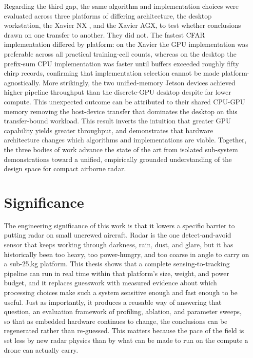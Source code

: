 Regarding the third gap, the same algorithm and implementation choices were evaluated 
across three platforms of differing architecture, the desktop workstation, the Xavier NX
, and the Xavier AGX, to test whether conclusions drawn on one transfer to another. 
They did not. The fastest CFAR implementation differed by platform: on the Xavier the 
GPU implementation was preferable across all practical training-cell counts, whereas on 
the desktop the prefix-sum CPU implementation was faster until buffers exceeded roughly 
fifty chirp records, confirming that implementation selection cannot be made platform-
agnostically. More strikingly, the two unified-memory Jetson devices achieved higher 
pipeline throughput than the discrete-GPU desktop despite far lower compute. This unexpected outcome
can be attributed to their shared CPU-GPU memory removing the host-device transfer that 
dominates the desktop on this transfer-bound workload. This result inverts the 
intuition that greater GPU capability yields greater throughput, and demonstrates that 
hardware architecture changes which algorithms and implementations are viable. 
Together, the three bodies of work advance the state of 
the art from isolated sub-system demonstrations toward a unified, empirically grounded 
understanding of the design space for compact airborne radar.

\section{Significance}

The engineering significance of this work is that it lowers a specific barrier to 
putting radar on small uncrewed aircraft. Radar is the one detect-and-avoid sensor that 
keeps working through darkness, rain, dust, and glare, but it has historically been too 
heavy, too power-hungry, and too coarse in angle to carry on a sub-25,kg platform. This 
thesis shows that a complete sensing-to-tracking pipeline can run in real time within 
that platform's size, weight, and power budget, and it replaces guesswork with measured 
evidence about which processing choices make such a system sensitive enough and fast 
enough to be useful. Just as importantly, it produces a reusable way of answering that 
question, an evaluation framework of profiling, ablation, and parameter sweeps, so that 
as embedded hardware continues to change, the conclusions can be regenerated rather 
than re-guessed. This matters because the pace of the field is set less by new radar 
physics than by what can be made to run on the compute a drone can actually carry.

